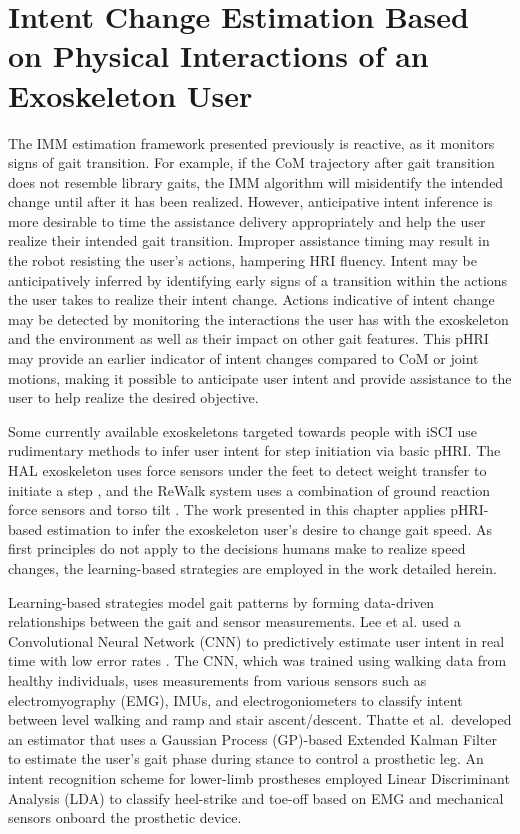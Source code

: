 \chapter{Intent Change Estimation Based on Physical Interactions of an	Exoskeleton User}\label{chapter:BKF}

The IMM estimation framework presented previously is reactive, as it monitors signs of gait transition. For example, if the CoM trajectory after gait transition does not resemble library gaits, the IMM algorithm will misidentify the intended change until after it has been realized. However, anticipative intent inference is more desirable to time the assistance delivery appropriately and help the user realize their intended gait transition. Improper assistance timing may result in the robot resisting the user's actions, hampering HRI fluency. Intent may be anticipatively inferred by identifying early signs of a transition within the actions the user takes to realize their intent change. Actions indicative of intent change may be detected by monitoring the interactions the user has with the exoskeleton and the environment as well as their impact on other gait features. This pHRI may provide an earlier indicator of intent changes compared to CoM or joint motions, making it possible to anticipate user intent and provide assistance to the user to help realize the desired objective. 

Some currently available exoskeletons targeted towards people with iSCI use rudimentary methods to infer user intent for step initiation via basic pHRI. The HAL exoskeleton uses force sensors under the feet to detect weight transfer to initiate a step \cite{suzuki2007intention}, and the ReWalk system uses a combination of ground reaction force sensors and torso tilt \cite{goffer2012locomotion}. The work presented in this chapter applies pHRI-based estimation to infer the exoskeleton user's desire to change gait speed. As first principles do not apply to the decisions humans make to realize speed changes, the learning-based strategies are employed in the work detailed herein.

Learning-based strategies model gait patterns by forming data-driven relationships between the gait and sensor measurements. Lee et al. used a Convolutional Neural Network (CNN) to predictively estimate user intent in real time with low error rates \cite{lee2020image}. The CNN, which was trained using walking data from healthy individuals, uses measurements from various sensors such as electromyography (EMG), IMUs, and electrogoniometers to classify intent between level walking and ramp and stair ascent/descent. Thatte et al.~developed an estimator that uses a Gaussian Process (GP)-based Extended Kalman Filter \cite{thatte2019robust} to estimate the user's gait phase during stance to control a prosthetic leg. An intent recognition scheme for lower-limb prostheses \cite{young2013classifying} employed Linear Discriminant Analysis (LDA) to classify heel-strike and toe-off based on EMG and mechanical sensors onboard the prosthetic device. 

